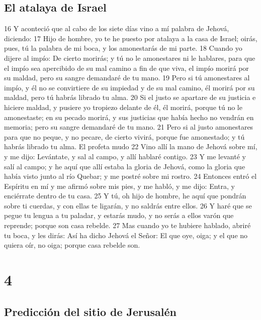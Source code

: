 \section*{El atalaya de Israel}

16 Y aconteció que al cabo de los siete días vino a mí palabra de Jehová, diciendo:
17 Hijo de hombre, yo te he puesto por atalaya a la casa de Israel; oirás, pues, tú la palabra de mi boca, y los amonestarás de mi parte.
18 Cuando yo dijere al impío: De cierto morirás; y tú no le amonestares ni le hablares, para que el impío sea apercibido de su mal camino a fin de que viva, el impío morirá por su maldad, pero su sangre demandaré de tu mano.
19 Pero si tú amonestares al impío, y él no se convirtiere de su impiedad y de su mal camino, él morirá por su maldad, pero tú habrás librado tu alma.
20 Si el justo se apartare de su justicia e hiciere maldad, y pusiere yo tropiezo delante de él, él morirá, porque tú no le amonestaste; en su pecado morirá, y sus justicias que había hecho no vendrán en memoria; pero su sangre demandaré de tu mano.
21 Pero si al justo amonestares para que no peque, y no pecare, de cierto vivirá, porque fue amonestado; y tú habrás librado tu alma.
El profeta mudo
22 Vino allí la mano de Jehová sobre mí, y me dijo: Levántate, y sal al campo, y allí hablaré contigo.
23 Y me levanté y salí al campo; y he aquí que allí estaba la gloria de Jehová, como la gloria que había visto junto al río Quebar; y me postré sobre mi rostro.
24 Entonces entró el Espíritu en mí y me afirmó sobre mis pies, y me habló, y me dijo: Entra, y enciérrate dentro de tu casa.
25 Y tú, oh hijo de hombre, he aquí que pondrán sobre ti cuerdas, y con ellas te ligarán, y no saldrás entre ellos.
26 Y haré que se pegue tu lengua a tu paladar, y estarás mudo, y no serás a ellos varón que reprende; porque son casa rebelde.
27 Mas cuando yo te hubiere hablado, abriré tu boca, y les dirás: Así ha dicho Jehová el Señor: El que oye, oiga; y el que no quiera oír, no oiga; porque casa rebelde son.

\chapter{4}

\section*{Predicción del sitio de Jerusalén}

